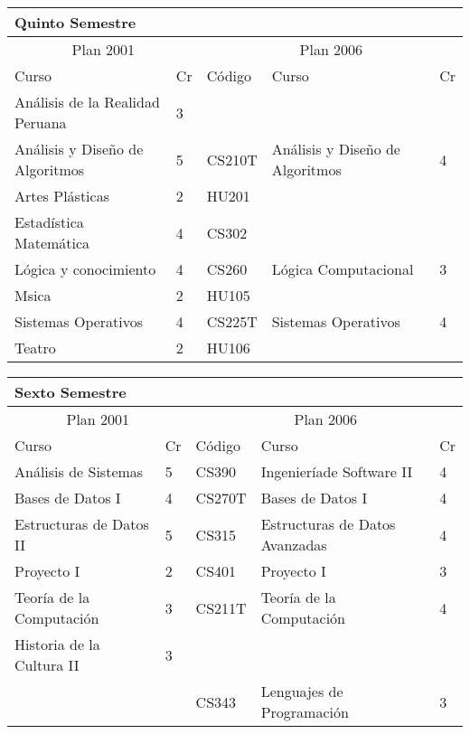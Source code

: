 \begin{center}
\begin{tabularx}{0.95\textwidth}{|p{4cm}|p{1cm}||p{2cm}|X|p{1cm}|}\hline
\multicolumn{5}{|l|}{\textbf{Quinto Semestre}} \\ \hline
\multicolumn{2}{|c|}{Plan 2001} & \multicolumn{3}{|c|}{Plan 2006} \\ \hline
Curso & Cr & Código & Curso & Cr \\ \hline
Análisis de la Realidad Peruana & 3 &  &  & \\ \hline
Análisis y Diseño de Algoritmos & 5 & CS210T & Análisis y Diseño de Algoritmos & 4 \\ \hline
Artes Plásticas & 2 & HU201 &  & \\ \hline
Estadística Matemática & 4 & CS302 &  & \\ \hline
Lógica y conocimiento & 4 & CS260 & Lógica Computacional & 3 \\ \hline
Msica & 2 & HU105 &  & \\ \hline
Sistemas Operativos & 4 & CS225T & Sistemas Operativos & 4 \\ \hline
Teatro & 2 & HU106 &  & \\ \hline
\end{tabularx}
\end{center}

\begin{center}
\begin{tabularx}{0.95\textwidth}{|p{4cm}|p{1cm}||p{2cm}|X|p{1cm}|}\hline
\multicolumn{5}{|l|}{\textbf{Sexto Semestre}} \\ \hline
\multicolumn{2}{|c|}{Plan 2001} & \multicolumn{3}{|c|}{Plan 2006} \\ \hline
Curso & Cr & Código & Curso & Cr \\ \hline
Análisis de Sistemas & 5 & CS390 & Ingenieríade Software II & 4 \\ \hline
Bases de Datos I & 4 & CS270T & Bases de Datos I & 4 \\ \hline
Estructuras de Datos II & 5 & CS315 & Estructuras de Datos Avanzadas & 4 \\ \hline
Proyecto I & 2 & CS401 & Proyecto I & 3 \\ \hline
Teoría de la Computación & 3 & CS211T & Teoría de la Computación & 4 \\ \hline
Historia de la Cultura II & 3 &  &  & \\ \hline
 &  & CS343 & Lenguajes de Programación & 3 \\ \hline
\end{tabularx}
\end{center}

